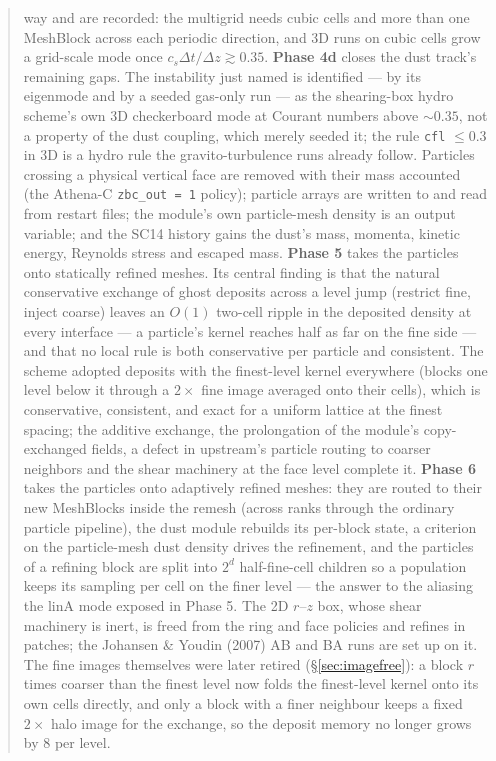 \documentclass[11pt]{article}
\newcommand{\code}[1]{\texttt{#1}}
\begin{document}
\begin{abstract}
way and are recorded: the multigrid needs cubic cells and more than one MeshBlock across
each periodic direction, and 3D runs on cubic cells grow a grid-scale mode once
$c_s\Delta t/\Delta z \gtrsim 0.35$.
\textbf{Phase 4d} closes the dust track's remaining gaps. The instability just named is
identified --- by its eigenmode and by a seeded gas-only run --- as the shearing-box
hydro scheme's own 3D checkerboard mode at Courant numbers above $\sim0.35$, not a
property of the dust coupling, which merely seeded it; the rule \code{cfl} $\le 0.3$ in
3D is a hydro rule the gravito-turbulence runs already follow. Particles crossing a
physical vertical face are removed with their mass accounted (the Athena-C
\code{zbc\_out = 1} policy); particle arrays are written to and read from restart files;
the module's own particle-mesh density is an output variable; and the SC14 history
gains the dust's mass, momenta, kinetic energy, Reynolds stress and escaped mass.
\textbf{Phase 5} takes the particles onto statically refined meshes. Its central finding
is that the natural conservative exchange of ghost deposits across a level jump
(restrict fine, inject coarse) leaves an $O(1)$ two-cell ripple in the deposited density
at every interface --- a particle's kernel reaches half as far on the fine side --- and
that no local rule is both conservative per particle and consistent. The scheme adopted
deposits with the finest-level kernel everywhere (blocks one level below it through a
$2\times$ fine image averaged onto their cells), which is conservative, consistent, and
exact for a uniform lattice at the finest spacing; the additive exchange, the
prolongation of the module's copy-exchanged fields, a defect in upstream's particle
routing to coarser neighbors and the shear machinery at the face level complete it.
\textbf{Phase 6} takes the particles onto adaptively refined meshes: they are routed to
their new MeshBlocks inside the remesh (across ranks through the ordinary particle
pipeline), the dust module rebuilds its per-block state, a criterion on the particle-mesh
dust density drives the refinement, and the particles of a refining block are split into
$2^d$ half-fine-cell children so a population keeps its sampling per cell on the finer
level --- the answer to the aliasing the linA mode exposed in Phase 5. The 2D $r$--$z$
box, whose shear machinery is inert, is freed from the ring and face policies and
refines in patches; the Johansen \& Youdin (2007) AB and BA runs are set up on it.
The fine images themselves were later retired (\S\ref{sec:imagefree}): a block $r$ times
coarser than the finest level now folds the finest-level kernel onto its own cells
directly, and only a block with a finer neighbour keeps a fixed $2\times$ halo image for
the exchange, so the deposit memory no longer grows by $8$ per level.


\end{abstract}
\end{document}
